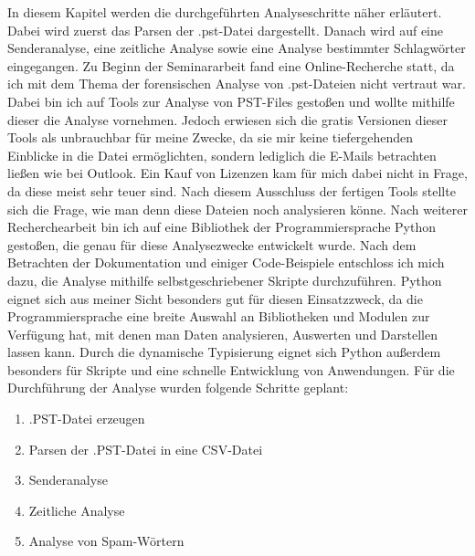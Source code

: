 In diesem Kapitel werden die durchgeführten Analyseschritte näher erläutert. Dabei wird zuerst das Parsen der .pst-Datei dargestellt. Danach wird auf eine Senderanalyse, eine zeitliche Analyse sowie eine Analyse bestimmter Schlagwörter eingegangen. Zu Beginn der Seminararbeit fand eine Online-Recherche statt, da ich mit dem Thema der forensischen Analyse von .pst-Dateien nicht vertraut war. Dabei bin ich auf Tools zur Analyse von PST-Files gestoßen und wollte mithilfe dieser die Analyse vornehmen. Jedoch erwiesen sich die gratis Versionen dieser Tools als unbrauchbar für meine Zwecke, da sie mir keine tiefergehenden Einblicke in die Datei ermöglichten, sondern lediglich die E-Mails betrachten ließen wie bei Outlook. Ein Kauf von Lizenzen kam für mich dabei nicht in Frage, da diese meist sehr teuer sind. Nach diesem Ausschluss der fertigen Tools stellte sich die Frage, wie man denn diese Dateien noch analysieren könne. Nach weiterer Recherchearbeit bin ich auf eine Bibliothek der Programmiersprache Python gestoßen, die genau für diese Analysezwecke entwickelt wurde. Nach dem Betrachten der Dokumentation und einiger Code-Beispiele entschloss ich mich dazu, die Analyse mithilfe selbstgeschriebener Skripte durchzuführen. Python eignet sich aus meiner Sicht besonders gut für diesen Einsatzzweck, da die Programmiersprache eine breite Auswahl an Bibliotheken und Modulen zur Verfügung hat, mit denen man Daten analysieren, Auswerten und Darstellen lassen kann. Durch die dynamische Typisierung eignet sich Python außerdem besonders für Skripte und eine schnelle Entwicklung von Anwendungen. Für die Durchführung der Analyse wurden folgende Schritte geplant:

\begin{enumerate}
    \item .PST-Datei erzeugen 
    \item Parsen der .PST-Datei in eine CSV-Datei
    \item Senderanalyse
    \item Zeitliche Analyse
    \item Analyse von Spam-Wörtern
\end{enumerate}